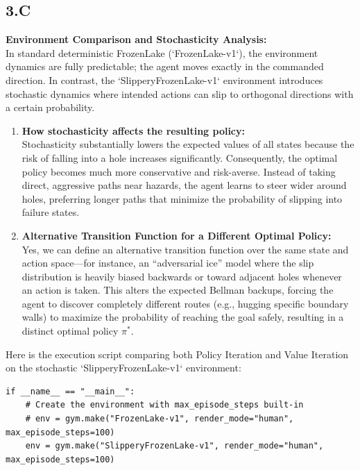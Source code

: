 \documentclass{article}
\begin{document}
\begin{enumerate}
\subsection*{3.C}

\textbf{Environment Comparison and Stochasticity Analysis:} \\
In standard deterministic FrozenLake (`FrozenLake-v1`), the environment dynamics are fully predictable; the agent moves exactly in the commanded direction. In contrast, the `SlipperyFrozenLake-v1` environment introduces stochastic dynamics where intended actions can slip to orthogonal directions with a certain probability. 

\begin{enumerate}
    \item \textbf{How stochasticity affects the resulting policy:} \\
    Stochasticity substantially lowers the expected values of all states because the risk of falling into a hole increases significantly. Consequently, the optimal policy becomes much more conservative and risk-averse. Instead of taking direct, aggressive paths near hazards, the agent learns to steer wider around holes, preferring longer paths that minimize the probability of slipping into failure states.
    
    \item \textbf{Alternative Transition Function for a Different Optimal Policy:} \\
    Yes, we can define an alternative transition function over the same state and action space—for instance, an ``adversarial ice'' model where the slip distribution is heavily biased backwards or toward adjacent holes whenever an action is taken. This alters the expected Bellman backups, forcing the agent to discover completely different routes (e.g., hugging specific boundary walls) to maximize the probability of reaching the goal safely, resulting in a distinct optimal policy $\pi^*$.
\end{enumerate}

Here is the execution script comparing both Policy Iteration and Value Iteration on the stochastic `SlipperyFrozenLake-v1` environment:

\begin{lstlisting}[caption={Execution script for SlipperyFrozenLake using Policy and Value Iteration},label={lst:slippery_exec}]
if __name__ == "__main__":
    # Create the environment with max_episode_steps built-in
    # env = gym.make("FrozenLake-v1", render_mode="human", max_episode_steps=100)
    env = gym.make("SlipperyFrozenLake-v1", render_mode="human", max_episode_steps=100)


\end{lstlisting}
\end{enumerate}
\end{document}
